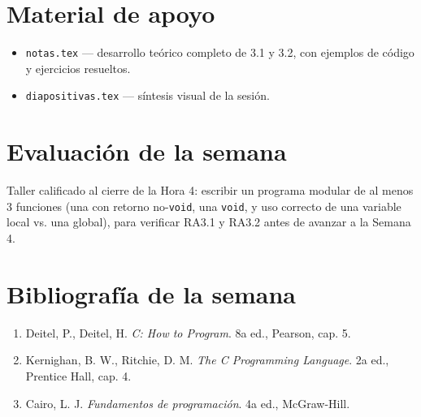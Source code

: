 \documentclass[11pt,letterpaper]{article}
\begin{document}
\section{Material de apoyo}

\begin{itemize}[leftmargin=1.2cm]
  \item \texttt{notas.tex} --- desarrollo teórico completo de 3.1 y 3.2, con ejemplos de código y
        ejercicios resueltos.
  \item \texttt{diapositivas.tex} --- síntesis visual de la sesión.
\end{itemize}

\section{Evaluación de la semana}

Taller calificado al cierre de la Hora 4: escribir un programa modular de al menos 3 funciones
(una con retorno no-\texttt{void}, una \texttt{void}, y uso correcto de una variable local vs. una
global), para verificar RA3.1 y RA3.2 antes de avanzar a la Semana 4.

\section{Bibliografía de la semana}

\begin{enumerate}[leftmargin=1.2cm]
  \item Deitel, P., Deitel, H. \emph{C: How to Program}. 8a ed., Pearson, cap. 5.
  \item Kernighan, B. W., Ritchie, D. M. \emph{The C Programming Language}. 2a ed., Prentice Hall,
        cap. 4.
  \item Cairo, L. J. \emph{Fundamentos de programación}. 4a ed., McGraw-Hill.
\end{enumerate}
\end{document}
